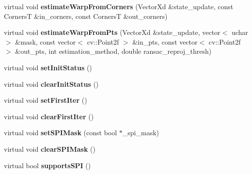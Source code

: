 \begin{DoxyCompactItemize}
\item 
\hypertarget{classStateSpaceModel_ab36e25193912bf9432a7847b338b456a}{virtual void {\bfseries estimate\-Warp\-From\-Corners} (Vector\-Xd \&state\-\_\-update, const Corners\-T \&in\-\_\-corners, const Corners\-T \&out\-\_\-corners)}\label{classStateSpaceModel_ab36e25193912bf9432a7847b338b456a}

\item 
\hypertarget{classStateSpaceModel_a9faa847a6517a1cf036b73a8e8b03106}{virtual void {\bfseries estimate\-Warp\-From\-Pts} (Vector\-Xd \&state\-\_\-update, vector$<$ uchar $>$ \&mask, const vector$<$ cv\-::\-Point2f $>$ \&in\-\_\-pts, const vector$<$ cv\-::\-Point2f $>$ \&out\-\_\-pts, int estimation\-\_\-method, double ransac\-\_\-reproj\-\_\-thresh)}\label{classStateSpaceModel_a9faa847a6517a1cf036b73a8e8b03106}

\item 
\hypertarget{classStateSpaceModel_a5a7a1a38551522e1877b453062fc0f1f}{virtual void {\bfseries set\-Init\-Status} ()}\label{classStateSpaceModel_a5a7a1a38551522e1877b453062fc0f1f}

\item 
\hypertarget{classStateSpaceModel_a9d9b5a754b969d02d1881f10945baad6}{virtual void {\bfseries clear\-Init\-Status} ()}\label{classStateSpaceModel_a9d9b5a754b969d02d1881f10945baad6}

\item 
\hypertarget{classStateSpaceModel_a7b56124a6faf2aea497050f697757806}{virtual void {\bfseries set\-First\-Iter} ()}\label{classStateSpaceModel_a7b56124a6faf2aea497050f697757806}

\item 
\hypertarget{classStateSpaceModel_a6eee4ed388bc0d8c7ce0b668cb67599f}{virtual void {\bfseries clear\-First\-Iter} ()}\label{classStateSpaceModel_a6eee4ed388bc0d8c7ce0b668cb67599f}

\item 
\hypertarget{classStateSpaceModel_a437deb778661e9202e42f3a636c33dea}{virtual void {\bfseries set\-S\-P\-I\-Mask} (const bool $\ast$\-\_\-spi\-\_\-mask)}\label{classStateSpaceModel_a437deb778661e9202e42f3a636c33dea}

\item 
\hypertarget{classStateSpaceModel_a5d474f0a621659071be9bd0cdf37136d}{virtual void {\bfseries clear\-S\-P\-I\-Mask} ()}\label{classStateSpaceModel_a5d474f0a621659071be9bd0cdf37136d}

\item 
\hypertarget{classStateSpaceModel_a43c5fa9bdbd4d33422102da5112b7cc7}{virtual bool {\bfseries supports\-S\-P\-I} ()}\label{classStateSpaceModel_a43c5fa9bdbd4d33422102da5112b7cc7}

\end{DoxyCompactItemize}
